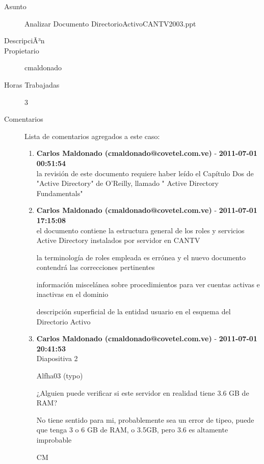 \begin{description}

\item[Asunto] Analizar Documento DirectorioActivoCANTV2003.ppt \item[DescripciÃ³n] \item[Propietario] cmaldonado\item[Horas Trabajadas] 3

\item[Comentarios] Lista de comentarios agregados a este caso:  
\begin{enumerate}
        \item {\bfseries Carlos Maldonado (cmaldonado@covetel.com.ve)  } - {\bfseries 2011-07-01 00:51:54} \\ la revisión de este documento requiere haber leído el Capítulo Dos de "Active Directory" de O'Reilly, llamado "
Active Directory Fundamentals"        \item {\bfseries Carlos Maldonado (cmaldonado@covetel.com.ve)  } - {\bfseries 2011-07-01 17:15:08} \\ el documento contiene la estructura general de los roles y servicios Active Directory instalados por servidor en CANTV

la terminología de roles empleada es errónea y el nuevo documento contendrá las correcciones pertinentes

información miscelánea sobre procedimientos para ver cuentas activas e inactivas en el dominio

descripción superficial de la entidad usuario en el esquema del Directorio Activo        \item {\bfseries Carlos Maldonado (cmaldonado@covetel.com.ve)  } - {\bfseries 2011-07-01 20:41:53} \\ Diapositiva 2

Alfha03 (typo)

¿Alguien puede verificar si este servidor en realidad tiene 3.6 GB de RAM?

No tiene sentido para mi, probablemente sea un error de tipeo, puede que tenga
3 o 6 GB de RAM, o 3.5GB, pero 3.6 es altamente improbable

CM


\end{enumerate}
\end{description}
